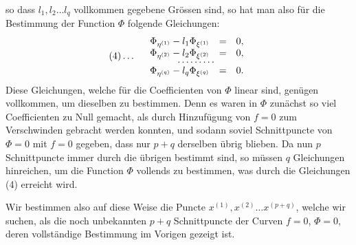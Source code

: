 \documentclass[10pt]{article}
\begin{document}
so dass \(l_1,l_2\ldots l_q\) vollkommen gegebene Grössen sind, so hat man also für die Bestimmung der Function \(\Phi\) folgende Gleichungen:
\[
(4)\ldots\quad
\begin{array}{rcl}
\Phi_{\eta^{(1)}}-l_1\Phi_{\xi^{(1)}}&=&0,\\
\Phi_{\eta^{(2)}}-l_2\Phi_{\xi^{(2)}}&=&0,\\[-0.3em]
\multicolumn{3}{c}{\cdots\cdots\cdots}\\[-0.3em]
\Phi_{\eta^{(q)}}-l_q\Phi_{\xi^{(q)}}&=&0.
\end{array}
\]
Diese Gleichungen, welche für die Coefficienten von \(\Phi\) linear sind, genügen vollkommen, um dieselben zu bestimmen. Denn es waren in \(\Phi\) zunächst so viel Coefficienten zu Null gemacht, als durch Hinzufügung von \(f=0\) zum Verschwinden gebracht werden konnten, und sodann soviel Schnittpuncte von \(\Phi=0\) mit \(f=0\) gegeben, dass nur \(p+q\) derselben übrig blieben. Da nun \(p\) Schnittpuncte immer durch die übrigen bestimmt sind, so müssen \(q\) Gleichungen hinreichen, um die Function \(\Phi\) vollends zu bestimmen, was durch die Gleichungen (4) erreicht wird.

Wir bestimmen also auf diese Weise die Puncte \(x^{(1)},x^{(2)}\ldots x^{(p+q)}\), welche wir suchen, als die noch unbekannten \(p+q\) Schnittpuncte der Curven \(f=0\), \(\Phi=0\), deren vollständige Bestimmung im Vorigen gezeigt ist.
\end{document}

